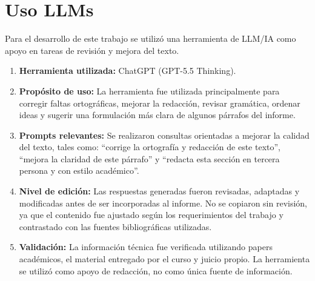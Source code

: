 \section{Uso LLMs}

\noindent Para el desarrollo de este trabajo se utilizó una herramienta de LLM/IA como apoyo en tareas de revisión y mejora del texto.

\begin{enumerate}
    \item \textbf{Herramienta utilizada:} ChatGPT (GPT-5.5 Thinking).

    \item \textbf{Propósito de uso:} La herramienta fue utilizada principalmente para corregir faltas ortográficas, mejorar la redacción, revisar gramática, ordenar ideas y sugerir una formulación más clara de algunos párrafos del informe.

    \item \textbf{Prompts relevantes:} Se realizaron consultas orientadas a mejorar la calidad del texto, tales como: ``corrige la ortografía y redacción de este texto'', ``mejora la claridad de este párrafo'' y ``redacta esta sección en tercera persona y con estilo académico''.

    \item \textbf{Nivel de edición:} Las respuestas generadas fueron revisadas, adaptadas y modificadas antes de ser incorporadas al informe. No se copiaron sin revisión, ya que el contenido fue ajustado según los requerimientos del trabajo y contrastado con las fuentes bibliográficas utilizadas.

    \item \textbf{Validación:} La información técnica fue verificada utilizando papers académicos, el material entregado por el curso y juicio propio. La herramienta se utilizó como apoyo de redacción, no como única fuente de información.
\end{enumerate}